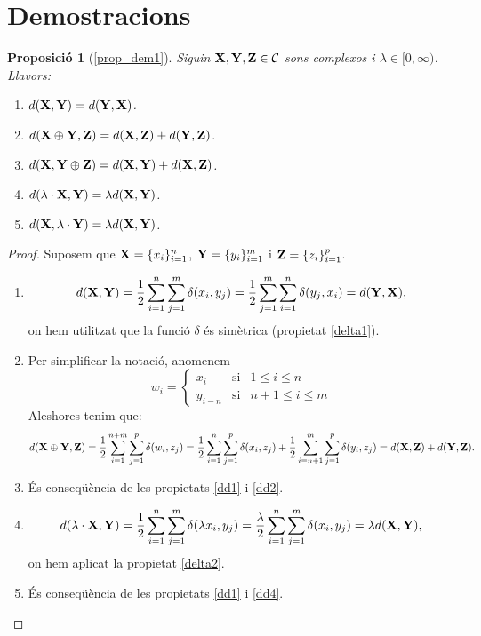 \documentclass{article}
\theoremstyle{math}
\theoremstyle{TheoremNum}
\newtheorem{prop*}[definition]{Proposició}
\newcommand{\0}{\ensuremath{\vb{0}}}
\newcommand{\X}{\ensuremath{\vb{X}}}
\newcommand{\Y}{\ensuremath{\vb{Y}}}
\newcommand{\Z}{\ensuremath{\vb{Z}}}
\begin{document}
\section{Demostracions}\label{demos}
\begin{prop*}[\ref*{prop_dem1}]
    Siguin $\X,\Y,\Z\in\mathcal{C}$ sons complexos i $\lambda\in[0,\infty)$. Llavors:
    \begin{enumerate}[label=$d$\arabic*),ref=$d$\arabic*]
        \item\label{dd1} $d(\X,\Y)=d(\Y,\X)$.
        \item\label{dd2} $d(\X\oplus\Y,\Z)=d(\X,\Z)+d(\Y,\Z)$.
        \item\label{dd3} $d(\X,\Y\oplus\Z)=d(\X,\Y)+d(\X,\Z)$.
        \item\label{dd4} $d(\lambda\cdot\X,\Y)=\lambda d(\X,\Y)$.
        \item\label{dd5} $d(\X,\lambda\cdot\Y)=\lambda d(\X,\Y)$.
    \end{enumerate}
\end{prop*}
\begin{proof}
    Suposem que $\X=\{x_i\}_{i=1}^n$, $\Y=\{y_i\}_{i=1}^m$ i $\Z=\{z_i\}_{i=1}^p$.
    \begin{enumerate}[label=$d$\arabic*)]
        \item $$d(\X,\Y)=\frac{1}{2}\sum_{i=1}^n\sum_{j=1}^m\delta(x_i,y_j)=\frac{1}{2}\sum_{j=1}^m\sum_{i=1}^n\delta(y_j,x_i)=d(\Y,\X),$$ on hem utilitzat que la funció $\delta$ és simètrica (propietat \ref{delta1}).
        \item Per simplificar la notació, anomenem 
        $$
        w_i=\left\{
        \begin{array}{ccc}
            x_i & \text{si} & 1\leq i\leq n\\
            y_{i-n} & \text{si} & n+1\leq i\leq m
        \end{array}\right.
        $$ Aleshores tenim que: $$d(\X\oplus\Y,\Z)=\frac{1}{2}\sum_{i=1}^{n+m}\sum_{j=1}^p\delta(w_i,z_j)=\frac{1}{2}\sum_{i=1}^n\sum_{j=1}^p\delta(x_i,z_j)+\frac{1}{2}\sum_{i=n+1}^m\sum_{j=1}^p\delta(y_i,z_j)=d(\X,\Z)+d(\Y,\Z).$$
        \item És conseqüència de les propietats \ref{dd1} i \ref{dd2}.
        \item $$d(\lambda\cdot\X,\Y)=\frac{1}{2}\sum_{i=1}^n\sum_{j=1}^m\delta(\lambda x_i,y_j)=\frac{\lambda}{2}\sum_{i=1}^n\sum_{j=1}^m\delta(x_i,y_j)=\lambda d(\X,\Y),$$ on hem aplicat la propietat \ref{delta2}.
        \item És conseqüència de les propietats \ref{dd1} i \ref{dd4}.
    \end{enumerate}
\end{proof}
\end{document}
